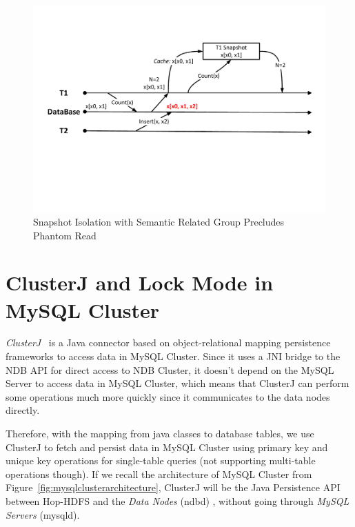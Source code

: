 \begin{figure}[!h]
	\centering
	\includegraphics[width=\linewidth]{figs/snapphantom.pdf}
	\caption{Snapshot Isolation with Semantic Related Group Precludes Phantom Read}
	\label{fig:snapphantom}
\end{figure}
  
\section{ClusterJ and Lock Mode in MySQL Cluster}

\textit{ClusterJ}~\cite{mysqlclusterj} is a Java connector based on object-relational mapping persistence frameworks to access data in MySQL Cluster. Since it uses a JNI bridge to the NDB API for direct access to NDB Cluster, it doesn't depend on the MySQL Server to access data in MySQL Cluster, which means that ClusterJ can perform some operations much more quickly since it communicates to the data nodes directly. 

\noindent Therefore, with the mapping from java classes to database tables, we use ClusterJ to fetch and persist data in MySQL Cluster using primary key and unique key operations for single-table queries (not supporting multi-table operations though). If we recall the architecture of MySQL Cluster from Figure~\ref{fig:mysqlclusterarchitecture}, ClusterJ will be the Java Persistence API between Hop-HDFS and the \textit{Data Nodes} (ndbd) , without going through \textit{MySQL Servers} (mysqld).

